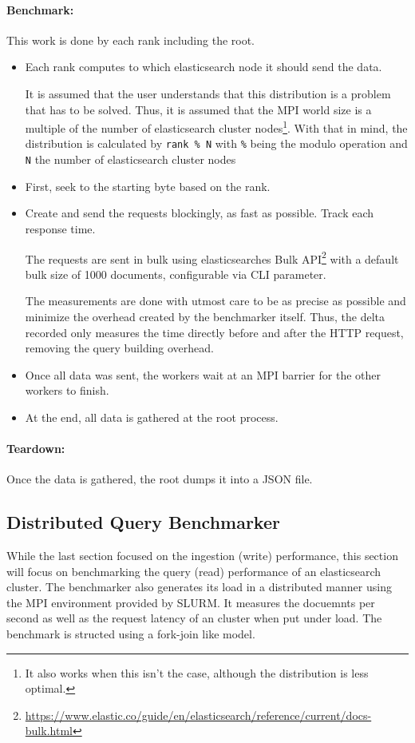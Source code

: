 \paragraph{Benchmark:} This work is done by each rank including the root.
\begin{itemize}
  \item Each rank computes to which elasticsearch node it should send the data. 

    It is assumed that the user understands that this distribution is a problem that has to be solved. Thus, it is assumed that the \ac{MPI} world size is a multiple of the number of elasticsearch cluster nodes\footnote{It also works when this isn't the case, although the distribution is less optimal.}. With that in mind, the distribution is calculated by \texttt{rank \% N} with \texttt{\%} being the modulo operation and \texttt{N} the number of elasticsearch cluster nodes

  \item First, seek to the starting byte based on the rank.
  \item Create and send the requests blockingly, as fast as possible. Track each response time.

    The requests are sent in bulk using elasticsearches Bulk API\footnote{\url{https://www.elastic.co/guide/en/elasticsearch/reference/current/docs-bulk.html}} with a default bulk size of 1000 documents, configurable via CLI parameter.

    The measurements are done with utmost care to be as precise as possible and minimize the overhead created by the benchmarker itself. Thus, the delta recorded only measures the time directly before and after the HTTP request, removing the query building overhead.
  \item Once all data was sent, the workers wait at an \ac{MPI} barrier for the other workers to finish.
  \item At the end, all data is gathered at the root process.
\end{itemize}

\paragraph{Teardown:}
Once the data is gathered, the root dumps it into a \ac{JSON} file.

\subsection{Distributed Query Benchmarker}
While the last section focused on the ingestion (write) performance, this section will focus on benchmarking the query (read) performance of an elasticsearch cluster. The benchmarker also generates its load in a distributed manner using the \ac{MPI} environment provided by SLURM. It measures the docuemnts per second as well as the request latency of an cluster when put under load. The benchmark is structed using a fork-join like model. 


